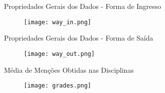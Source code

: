 \begin{frame}{Propriedades Gerais dos Dados - Forma de Ingresso}
    \begin{figure}[!ht]
        \centering
        \texttt{[image: way\_in.png]}
    \end{figure}
\end{frame}

\begin{frame}{Propriedades Gerais dos Dados - Forma de Saída}
    \begin{figure}[!ht]
        \centering
        \texttt{[image: way\_out.png]}
    \end{figure}
\end{frame}

\begin{frame}{Média de Menções Obtidas nas Disciplinas}
    \begin{figure}[!ht]
        \centering
        \texttt{[image: grades.png]}
    \end{figure}
\end{frame}



